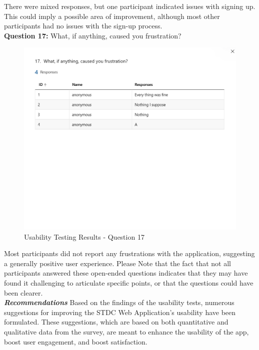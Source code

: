 \begin{justify}
\vspace{0.25cm}
\newendline There were mixed responses, but one participant indicated issues with signing up. This could imply a possible area of improvement, although most other participants had no issues with the sign-up process.\\

\clearpage
\vspace{0.25cm}
\newendline \textbf{Question 17:} What, if anything, caused you frustration?

\begin{figure}[H]
    \centerline{\includegraphics[width=150mm,scale=1]{figures/implementation_and_testing/testing/MUT/answers/Answers (17).png}}
    \caption{Usability Testing Results - Question 17}
    \label{Usability Testing Results - Question 17}
\end{figure}

\vspace{0.25cm}
\newendline Most participants did not report any frustrations with the application, suggesting a generally positive user experience.\newendline
Please Note that the fact that not all participants answered these open-ended questions indicates that they may have found it challenging to articulate specific points, or that the questions could have been clearer.\\

\clearpage
\newendline \textbf{\textit{Recommendations}}\newendline
Based on the findings of the usability tests, numerous suggestions for improving the STDC Web Application's usability have been formulated. These suggestions, which are based on both quantitative and qualitative data from the survey, are meant to enhance the usability of the app, boost user engagement, and boost satisfaction.


\end{justify}
